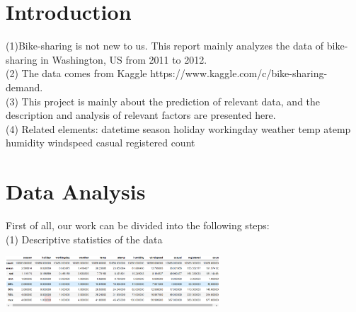 \section{Introduction}
\label{sec-intro}
   (1)Bike-sharing is not new to us. This report mainly analyzes the data of bike-sharing in Washington, US from 2011 to 2012.\\
   (2) The data comes from Kaggle https://www.kaggle.com/c/bike-sharing-demand.\\
   (3) This project is mainly about the prediction of relevant data, and the description and analysis of relevant factors are presented here.\\
   (4) Related elements: datetime  season  holiday  workingday  weather temp  atemp 
   humidity  windspeed  casual  registered  count 
\section{Data Analysis} \label{sec-preliminaries}

First of all, our work can be divided into the following steps:\\
(1)   Descriptive statistics of the data
\begin{center}
  \begin{minipage}{1\linewidth}
  \centering
  \includegraphics[width=0.6\textwidth]{pic/a.eps}
  \end{minipage}
  \hfill
\end{center}

